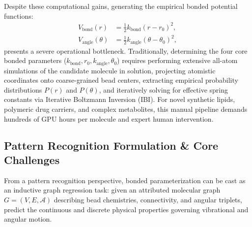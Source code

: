 \documentclass[11pt,a4paper]{article}
\begin{document}
Despite these computational gains, generating the empirical bonded potential functions:
\begin{align}
V_{\text{bond}}(r) &= \frac{1}{2} k_{\text{bond}} (r - r_0)^2, \label{eq:vbond}\\
V_{\text{angle}}(\theta) &= \frac{1}{2} k_{\text{angle}} (\theta - \theta_0)^2, \label{eq:vangle}
\end{align}
presents a severe operational bottleneck. Traditionally, determining the four core bonded parameters ($k_{\text{bond}}, r_0, k_{\text{angle}}, \theta_0$) requires performing extensive all-atom simulations of the candidate molecule in solution, projecting atomistic coordinates onto coarse-grained bead centers, extracting empirical probability distributions $P(r)$ and $P(\theta)$, and iteratively solving for effective spring constants via Iterative Boltzmann Inversion (IBI). For novel synthetic lipids, polymeric drug carriers, and complex metabolites, this manual pipeline demands hundreds of GPU hours per molecule and expert human intervention.

\subsection{Pattern Recognition Formulation \& Core Challenges}
From a pattern recognition perspective, bonded parameterization can be cast as an inductive graph regression task: given an attributed molecular graph $G = (V, E, \mathcal{A})$ describing bead chemistries, connectivity, and angular triplets, predict the continuous and discrete physical properties governing vibrational and angular motion.
\end{document}
